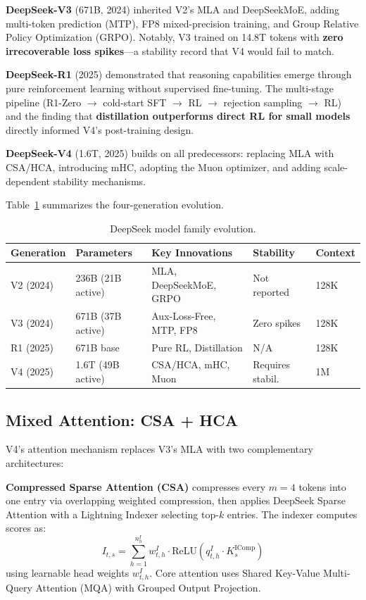 \documentclass[11pt,a4paper]{article}
\begin{document}
\textbf{DeepSeek-V3} (671B, 2024) inherited V2's MLA and DeepSeekMoE, adding multi-token prediction (MTP), FP8 mixed-precision training, and Group Relative Policy Optimization (GRPO). Notably, V3 trained on 14.8T tokens with \textbf{zero irrecoverable loss spikes}---a stability record that V4 would fail to match.

\textbf{DeepSeek-R1} (2025) demonstrated that reasoning capabilities emerge through pure reinforcement learning without supervised fine-tuning. The multi-stage pipeline (R1-Zero $\to$ cold-start SFT $\to$ RL $\to$ rejection sampling $\to$ RL) and the finding that \textbf{distillation outperforms direct RL for small models} directly informed V4's post-training design.

\textbf{DeepSeek-V4} (1.6T, 2025) builds on all predecessors: replacing MLA with CSA/HCA, introducing mHC, adopting the Muon optimizer, and adding scale-dependent stability mechanisms.

Table~\ref{tab:evolution} summarizes the four-generation evolution.

\begin{table}[H]
\centering
\caption{DeepSeek model family evolution.}
\label{tab:evolution}
\begin{tabular}{lllll}
\toprule
\textbf{Generation} & \textbf{Parameters} & \textbf{Key Innovations} & \textbf{Stability} & \textbf{Context} \\
\midrule
V2 (2024) & 236B (21B active) & MLA, DeepSeekMoE, GRPO & Not reported & 128K \\
V3 (2024) & 671B (37B active) & Aux-Loss-Free, MTP, FP8 & Zero spikes & 128K \\
R1 (2025) & 671B base & Pure RL, Distillation & N/A & 128K \\
V4 (2025) & 1.6T (49B active) & CSA/HCA, mHC, Muon & Requires stabil. & 1M \\
\bottomrule
\end{tabular}
\end{table}

\subsection{Mixed Attention: CSA + HCA}
\label{sec:attention}

V4's attention mechanism replaces V3's MLA with two complementary architectures:

\textbf{Compressed Sparse Attention (CSA)} compresses every $m=4$ tokens into one entry via overlapping weighted compression, then applies DeepSeek Sparse Attention with a Lightning Indexer selecting top-$k$ entries. The indexer computes scores as:
\begin{equation}
I_{t,s} = \sum_{h=1}^{n_h^I} w_{t,h}^I \cdot \text{ReLU}(q_{t,h}^I \cdot K_s^{\text{IComp}})
\end{equation}
using learnable head weights $w_{t,h}^I$. Core attention uses Shared Key-Value Multi-Query Attention (MQA) with Grouped Output Projection.
\end{document}
